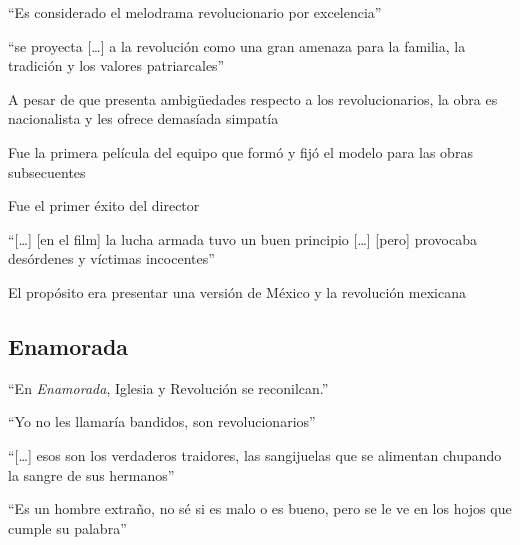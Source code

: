 \begin{compactitem}
    \item ``Es considerado el melodrama revolucionario por excelencia''\autocite[178]{guerrero_imagen_2005}
    \item ``se proyecta [\ldots] a la revolución como una gran amenaza para la familia, la tradición y los valores patriarcales''\autocite[178]{guerrero_imagen_2005}
    \item A pesar de que presenta ambigüedades respecto a los revolucionarios, la obra es nacionalista y les ofrece demasíada simpatía\autocite[87]{demello_unfinished_2001}
    \item Fue la primera película del equipo que formó y fijó el modelo para las obras subsecuentes\autocite[86]{demello_unfinished_2001}
    \item Fue el primer éxito del director\autocite[19]{costa_cine_2010}
    \item ``[\ldots] [en el film] la lucha armada tuvo un buen principio [\ldots] [pero] provocaba desórdenes y víctimas incocentes''\autocite[36]{blanco_aventura_1993}
    \item El propósito era presentar una versión de México y la revolución mexicana\autocite[23:19]{soler_serrano_emilio_1976}
    \end{compactitem} 

\subsection{Enamorada}
    \begin{compactitem}
    \item ``En \emph{Enamorada}, Iglesia y Revolución se reconilcan.''\autocite[377]{sanchez_vi._2010}
    \item ``Yo no les llamaría bandidos, son revolucionarios''\autocite[5:31]{fernandez_enamorada_1946}
    \item ``[\ldots] esos son los verdaderos traidores, las sangijuelas que se alimentan chupando la sangre de sus hermanos''\autocite[14:11]{fernandez_enamorada_1946}
    \item ``Es un hombre extraño, no sé si es malo o es bueno, pero se le ve en los hojos que cumple su palabra''\autocite[39:00]{fernandez_enamorada_1946}
    \end{compactitem} 

